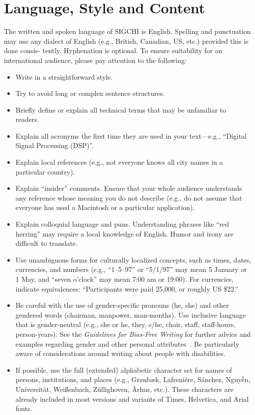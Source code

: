 \documentclass{sigchi}
\begin{document}
\section{Language, Style and Content}

The written and spoken language of SIGCHI is English. Spelling and
punctuation may use any dialect of English (e.g., British, Canadian,
US, etc.) provided this is done consis- tently. Hyphenation is
optional. To ensure suitability for an international audience, please
pay attention to the following:

\begin{itemize}
\item Write in a straightforward style.
\item Try to avoid long or complex sentence structures.
\item Briefly define or explain all technical terms that may be
  unfamiliar to readers.
\item Explain all acronyms the first time they are used in your
  text---e.g., ``Digital Signal Processing (DSP)''.
\item Explain local references (e.g., not everyone knows all city
  names in a particular country).
\item Explain ``insider'' comments. Ensure that your whole audience
  understands any reference whose meaning you do not describe (e.g.,
  do not assume that everyone has used a Macintosh or a particular
  application).
\item Explain colloquial language and puns. Understanding phrases like
  ``red herring'' may require a local knowledge of English.  Humor and
  irony are difficult to translate.
\item Use unambiguous forms for culturally localized concepts, such as
  times, dates, currencies, and numbers (e.g., ``1--5--97'' or
  ``5/1/97'' may mean 5 January or 1 May, and ``seven o'clock'' may
  mean 7:00 am or 19:00). For currencies, indicate equivalences:
  ``Participants were paid {\selectfont \textwon}
  25,000, or roughly US \$22.''
\item Be careful with the use of gender-specific pronouns (he, she)
  and other gendered words (chairman, manpower, man-months). Use
  inclusive language that is gender-neutral (e.g., she or he, they,
  s/he, chair, staff, staff-hours, person-years). See the
  \textit{Guidelines for Bias-Free Writing} for further advice and
  examples regarding gender and other personal
  attributes~\cite{Schwartz:1995:GBF}. Be particularly aware of
  considerations around writing about people with disabilities.
\item If possible, use the full (extended) alphabetic character set
  for names of persons, institutions, and places (e.g.,
  Gr{\o}nb{\ae}k, Lafreni\'ere, S\'anchez, Nguy\~{\^{e}}n,
  Universit{\"a}t, Wei{\ss}enbach, Z{\"u}llighoven, \r{A}rhus, etc.).
  These characters are already included in most versions and variants
  of Times, Helvetica, and Arial fonts.
\end{itemize}
\end{document}
